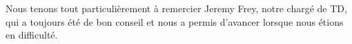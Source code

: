 \begin{thanks_perso}
Nous tenons tout particulièrement à remercier Jeremy Frey, notre chargé de TD, qui a toujours été de bon conseil et nous a permis d’avancer lorsque nous étions en difficulté.
\end{thanks_perso}